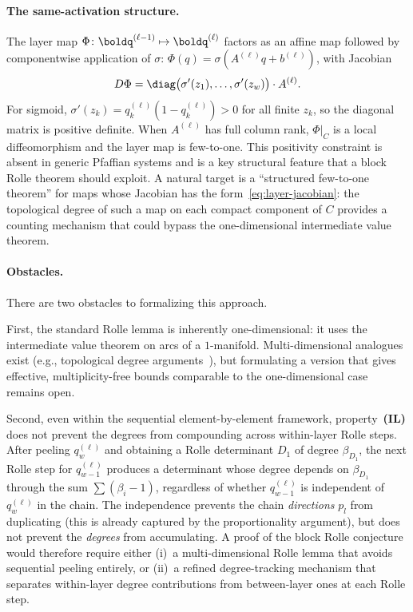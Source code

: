 \paragraph{The same-activation structure.}
The layer map $\Phi\colon \boldq^{(\ell-1)} \mapsto \boldq^{(\ell)}$ factors as an affine map followed by componentwise application of $\sigma$: $\Phi(q) = \sigma(A^{(\ell)} q + b^{(\ell)})$, with Jacobian
\begin{equation}\label{eq:layer-jacobian}
  D\Phi = \diag\bigl(\sigma'(z_1), \ldots, \sigma'(z_w)\bigr) \cdot A^{(\ell)}.
\end{equation}
For sigmoid, $\sigma'(z_k) = q_k^{(\ell)}(1 - q_k^{(\ell)}) > 0$ for all finite $z_k$, so the diagonal matrix is positive definite. When $A^{(\ell)}$ has full column rank, $\Phi|_C$ is a local diffeomorphism and the layer map is few-to-one. This positivity constraint is absent in generic Pfaffian systems and is a key structural feature that a block Rolle theorem should exploit. A natural target is a ``structured few-to-one theorem'' for maps whose Jacobian has the form~\eqref{eq:layer-jacobian}: the topological degree of such a map on each compact component of $C$ provides a counting mechanism that could bypass the one-dimensional intermediate value theorem.

\paragraph{Obstacles.}
There are two obstacles to formalizing this approach.

First, the standard Rolle lemma is inherently one-dimensional: it uses the intermediate value theorem on arcs of a $1$-manifold. Multi-dimensional analogues exist (e.g., topological degree arguments~\cite{khovanskiui1991fewnomials}), but formulating a version that gives effective, multiplicity-free bounds comparable to the one-dimensional case remains open.

Second, even within the sequential element-by-element framework, property~\textbf{(IL)} does not prevent the degrees from compounding across within-layer Rolle steps. After peeling $q_w^{(\ell)}$ and obtaining a Rolle determinant $D_1$ of degree $\beta_{D_1}$, the next Rolle step for $q_{w-1}^{(\ell)}$ produces a determinant whose degree depends on $\beta_{D_1}$ through the sum $\sum(\beta_i - 1)$, regardless of whether $q_{w-1}^{(\ell)}$ is independent of $q_w^{(\ell)}$ in the chain. The independence prevents the chain \emph{directions} $p_l$ from duplicating (this is already captured by the proportionality argument), but does not prevent the \emph{degrees} from accumulating. A proof of the block Rolle conjecture would therefore require either (i)~a multi-dimensional Rolle lemma that avoids sequential peeling entirely, or (ii)~a refined degree-tracking mechanism that separates within-layer degree contributions from between-layer ones at each Rolle step.

